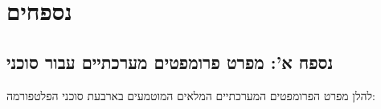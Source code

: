 \chapter*{נספחים}
\label{chap:appendices}

\section*{נספח א': מפרט פרומפטים מערכתיים עבור סוכני \projectname{}}
\label{app:agent_prompts}

להלן מפרט הפרומפטים המערכתיים המלאים המוטמעים בארבעת סוכני הפלטפורמה:

